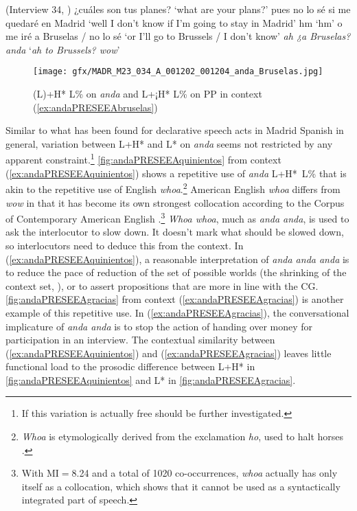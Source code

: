 \begin{exe}
	\ex (Interview 34, \cite{PRESEEA.20142020}) \label{ex:andaPRESEEAbruselas}
	 ¿cuáles son tus planes?  
	\glt `what are your plans?' 
	 pues no lo sé si me quedaré en Madrid  
	\glt `well I don't know if I'm going to stay in Madrid' 
	 hm  
	\glt `hm' 
	 o me iré a Bruselas / no lo sé 
	\glt `or I'll go to Brussels / I don't know'
	  \textit{ah ¿a Bruselas? anda} 
	\glt `\textit{ah to Brussels? wow}' 
\end{exe}


\begin{figure}
	\texttt{[image: gfx/MADR\_M23\_034\_A\_001202\_001204\_anda\_Bruselas.jpg]}
	\caption{(L)+H* L\% on \textit{anda} and L+¡H* L\% on PP in context (\ref{ex:andaPRESEEAbruselas}) \href{https://osf.io/pvwf2/}{\faVolumeUp} \label{fig:andaPRESEEAbruselas}}
\end{figure}

Similar to what has been found for declarative speech acts in Madrid Spanish in general, variation between L+H* and L* on \textit{anda} seems not restricted by any apparent constraint.\footnote{If this variation is actually free should be further investigated.} \autoref{fig:andaPRESEEAquinientos} from context (\ref{ex:andaPRESEEAquinientos}) shows a repetitive use of \textit{anda} L+H*~L\% that is akin to the repetitive use of English \textit{whoa}.\footnote{\textit{Whoa} is etymologically derived from the exclamation \textit{ho}, used to halt horses \citep{Skeat.1896}.} American English \textit{whoa} differs from \textit{wow} in that it has become its own strongest collocation according to the Corpus of Contemporary American English \citep{Davies.19902019}.\footnote{With \ac{MI}$=$8.24 and a total of 1020 co-occurrences, \textit{whoa} actually has only itself as a collocation, which shows that it cannot be used as a syntactically integrated part of speech.} \textit{Whoa whoa}, much as \textit{anda anda}, is used to ask the interlocutor to slow down. It doesn't mark what should be slowed down, so interlocutors need to deduce this from the context. In (\ref{ex:andaPRESEEAquinientos}), a reasonable interpretation of \textit{anda anda anda} is to reduce the pace of reduction of the set of possible worlds (the shrinking of the context set, \cite{Stalnaker.1978}), or to assert propositions that are more in line with the \ac{CG}. \autoref{fig:andaPRESEEAgracias} from context (\ref{ex:andaPRESEEAgracias}) is another example of this repetitive use. In (\ref{ex:andaPRESEEAgracias}), the conversational implicature of \textit{anda anda} is to stop the action of handing over money for participation in an interview. The contextual similarity between (\ref{ex:andaPRESEEAquinientos}) and (\ref{ex:andaPRESEEAgracias}) leaves little functional load to the prosodic difference between L+H* in \autoref{fig:andaPRESEEAquinientos} and L* in \autoref{fig:andaPRESEEAgracias}.\largerpage

